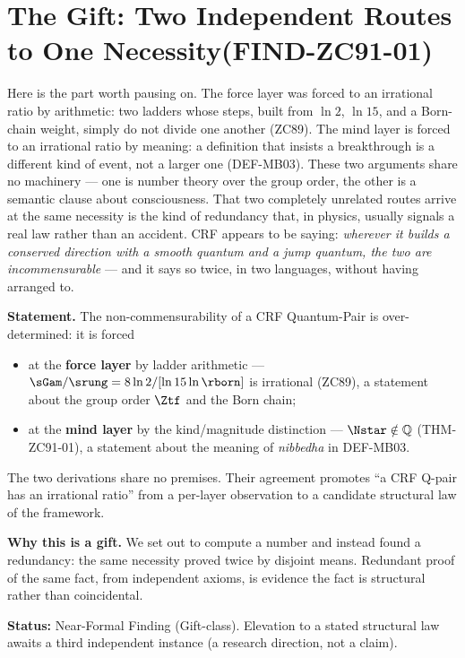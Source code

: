 \documentclass[12pt, a4paper]{article}
\begin{document}
\section{The Gift: Two Independent Routes to One Necessity\quad(FIND-ZC91-01)}
\label{sec:find-zc91}

Here is the part worth pausing on. The force layer was forced to an
irrational ratio by arithmetic: two ladders whose steps, built from
$\ln2$, $\ln15$, and a Born-chain weight, simply do not divide one
another (ZC89). The mind layer is forced to an irrational ratio by
meaning: a definition that insists a breakthrough is a different kind of
event, not a larger one (DEF-MB03). These two arguments share no
machinery --- one is number theory over the group order, the other is a
semantic clause about consciousness. That two completely unrelated routes
arrive at the same necessity is the kind of redundancy that, in physics,
usually signals a real law rather than an accident. CRF appears to be
saying: \emph{wherever it builds a conserved direction with a smooth
quantum and a jump quantum, the two are incommensurable} --- and it says
so twice, in two languages, without having arranged to.

\begin{giftbox}[title={FIND-ZC91-01: Independent-Route Redundancy (Gift)}]
\textbf{Statement.} The non-commensurability of a CRF Quantum-Pair is
over-determined: it is forced
\begin{itemize}[leftmargin=2em, noitemsep]
  \item at the \textbf{force layer} by ladder arithmetic ---
    $\sGam/\srung=8\ln2/[\ln15\ln\rborn]$ is irrational (ZC89), a
    statement about the group order $\Ztf$ and the Born chain;
  \item at the \textbf{mind layer} by the kind/magnitude distinction ---
    $\Nstar\notin\mathbb{Q}$ (THM-ZC91-01), a statement about the meaning
    of \emph{nibbedha} in DEF-MB03.
\end{itemize}
The two derivations share no premises. Their agreement promotes ``a CRF
Q-pair has an irrational ratio'' from a per-layer observation to a
candidate structural law of the framework.

\textbf{Why this is a gift.} We set out to compute a number and instead
found a redundancy: the same necessity proved twice by disjoint means.
Redundant proof of the same fact, from independent axioms, is evidence
the fact is structural rather than coincidental.


\textbf{Status:} Near-Formal Finding (Gift-class). Elevation to a stated
structural law awaits a third independent instance (a research direction,
not a claim).
\end{giftbox}
\end{document}
